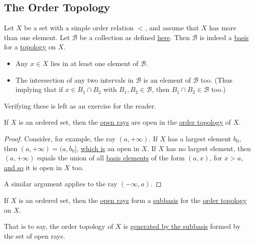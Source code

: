 \subsection{The Order Topology}\label{e94f389}

\label{fe258d1}

Let $X$ be a set with a simple order relation $<$, and assume that $X$ has more
than one element. Let $\mathcal B$ be a collection as defined
\href{aaff6da}{here}. Then $\mathcal B$ is indeed a \href{e896402}{basis} for a
\href{cc8eb8b}{topology} on $X$.

\begin{itemize}
  \item Any $x\in X$ lies in at least one element of $\mathcal B$.
  \item The intersection of any two intervals in $\mathcal B$ is an element of
        $\mathcal B$ too. (Thus implying that if $x\in B_1\cap B_2$ with
        $B_1,B_2\in\mathcal B$, then $B_1\cap B_2\in\mathcal B$ too.)
\end{itemize}

Verifying these is left as an exercise for the reader.

\label{e52c18d}

If $X$ is an ordered set, then the \href{b1745d9}{open rays} are open in the
\href{aaff6da}{order topology} of $X$.

\begin{proof}
  Consider, for example, the ray $(a,+\infty)$. If $X$ has a largest element
  $b_0$, then $(a,+\infty)=(a,b_0]$, \href{aaff6da}{which is} an open in
  $X$. If $X$ has no largest element, then $(a,+\infty)$ equals the union of
  all \href{aaff6da}{basis elements} of the form $(a,x)$, for $x>a$,
  \href{cc8eb8b}{and so} it is open in $X$ too.

  A similar argument applies to the ray $(-\infty,a)$.
\end{proof}

\label{bc48b15}

If $X$ is an ordered set, then the \href{b1745d9}{open rays} form a
\href{aba7b48}{subbasis} for the \href{aaff6da}{order topology} on $X$.

That is to say, the order topology of $X$ is \href{d1d3329}{generated by the
subbasis} formed by the set of open rays.

